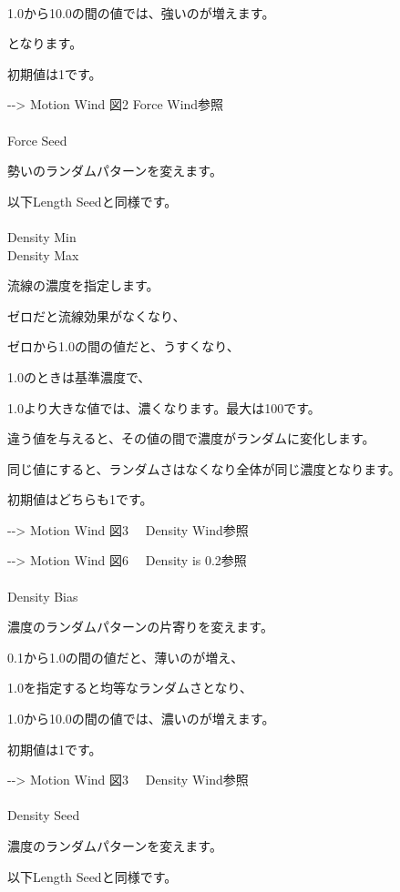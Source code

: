 \documentclass[a4paper,12pt]{article}
\begin{document}
\ \vspace{-0.2em}
\par
1.0から10.0の間の値では、強いのが増えます。\par
となります。\par
初期値は1です。\par
-{-}> \textquotedbl Motion Wind 図2 Force Wind\textquotedbl 参照\\
\\
Force Seed\par
勢いのランダムパターンを変えます。\par
以下\textquotedbl Length Seed\textquotedbl と同様です。\\
\\
Density Min\\
Density Max\par
流線の濃度を指定します。\par
ゼロだと流線効果がなくなり、\par
ゼロから1.0の間の値だと、うすくなり、\par
1.0のときは基準濃度で、\par
1.0より大きな値では、濃くなります。最大は100です。\par
違う値を与えると、その値の間で濃度がランダムに変化します。\par
同じ値にすると、ランダムさはなくなり全体が同じ濃度となります。\par
初期値はどちらも1です。\par
-{-}> \textquotedbl Motion Wind 図3 \ \ Density Wind\textquotedbl 参照\par
-{-}> \textquotedbl Motion Wind 図6 \ \ Density is 0.2\textquotedbl 参照\\
\\
Density Bias\par
濃度のランダムパターンの片寄りを変えます。\par
0.1から1.0の間の値だと、薄いのが増え、\par
1.0を指定すると均等なランダムさとなり、\par
1.0から10.0の間の値では、濃いのが増えます。\par
初期値は1です。\par
-{-}> \textquotedbl Motion Wind 図3 \ \ Density Wind\textquotedbl 参照\\
\\
Density Seed\par
濃度のランダムパターンを変えます。\par
以下\textquotedbl Length Seed\textquotedbl と同様です。\\
\end{document}
